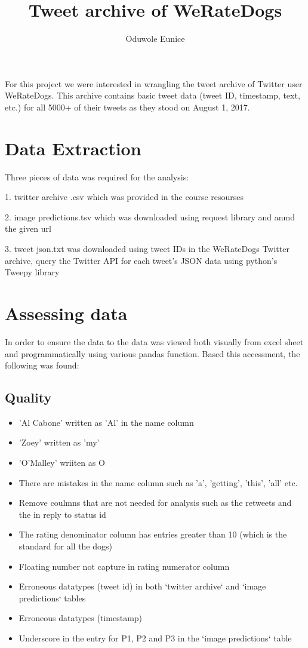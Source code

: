 \documentclass[10pt,a4paper]{article}
\author{Oduwole Eunice}
\title{ Tweet archive of  WeRateDogs}
\date{}
\begin{document}
\maketitle
\noindent For this project we were interested in wrangling  the tweet archive of Twitter user WeRateDogs. This archive contains basic tweet data (tweet ID, timestamp, text, etc.) for all 5000+ of their tweets as they stood on August 1, 2017.


\section*{Data Extraction}
\noindent Three pieces of data was required for the analysis:
\begin{list}{}{}
\item[1.] twitter archive .csv which was provided in the course resourses
\item[2.]image predictions.tsv which was downloaded using request library and anmd the given url 
\item[3.]tweet json.txt was downloaded using tweet IDs in the WeRateDogs Twitter archive, query the Twitter API for each tweet's JSON data using python's Tweepy library 
\end{list}


\section*{Assessing data}
In order to ensure the data to the data was viewed both visually from excel sheet and programmatically using various pandas function. Based this accessment, the following was found:
\subsection*{ Quality}
\begin{itemize}
\item  'Al Cabone' written as 'Al' in the name column
\item 'Zoey' written as 'my'
\item 'O'Malley' wriiten as O
\item There are mistakes in the name column such as 'a', 'getting', 'this', 'all' etc.
\item Remove coulmns that are not needed for analysis such as the retweets and the in reply to status id
\item The rating denominator column has entries greater than 10 (which is the standard for all the dogs)
\item Floating number not capture in  rating numerator column 
\item  Erroneous datatypes (tweet id) in both `twitter archive` and `image predictions` tables
\item  Erroneous datatypes (timestamp)
\item Underscore in the entry for  P1, P2 and P3 in the `image predictions` table
\end{itemize}
\end{document}
